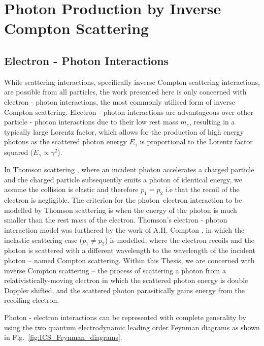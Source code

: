 \documentclass[../main.tex]{subfiles}
\begin{document}
\chapter{Photon Production by Inverse Compton Scattering}
\label{Photon_Production_by_Inverse_Compton_Scattering} %

\section{Electron - Photon Interactions}
\label{sec:electron_photon_interactions}

While scattering interactions, specifically inverse Compton scattering interactions, are possible from all particles, the work presented here is only concerned with electron - photon interactions, the most commonly utilised form of inverse Compton scattering.  Electron - photon interactions are advantageous over other particle - photon interactions due to their low rest mass $m_{e}$, resulting in a typically large Lorentz factor, which allows for the production of high energy photons as the scattered photon energy $E_{\gamma}$ is proportional to the Lorentz factor squared ($E_{\gamma}\propto\gamma^{2}$).    

In Thomson scattering \cite{thomson1904xxxiv}, where an incident photon accelerates a charged particle and the charged particle subsequently emits a photon of identical energy, we assume the collision is elastic and therefore $p_{1} = p_{2}$ i.e that the recoil of the electron is negligible. The criterion for the photon--electron interaction to be modelled by Thomson scattering is when the energy of the photon is much smaller than the rest mass of the electron. Thomson's electron - photon interaction model was furthered by the work of A.H. Compton \cite{compton1923quantum}, in which the inelastic scattering case ($p_{1} \neq p_{2}$) is modelled, where the electron recoils and the photon is scattered with a different wavelength to the wavelength of the incident photon -- named Compton scattering. Within this Thesis, we are concerned with inverse Compton scattering -- the process of scattering a photon from a relativistically-moving electron in which the scattered photon energy is double Doppler shifted, and the scattered photon parasitically gains energy from the recoiling electron.  

Photon - electron interactions can be represented with complete generality by using the two quantum electrodynamic leading order Feynman diagrams as shown in Fig.~\ref{fig:ICS_Feynman_diagrams}. 
\end{document}
